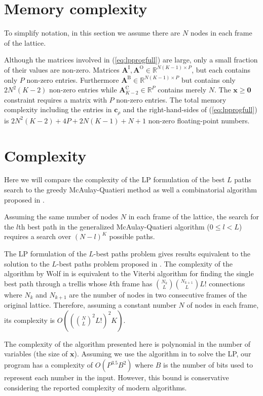 \documentclass{article}
\newcommand{\cLP}{\boldsymbol{c}_{\rho}}
\newcommand{\BS}[1]{\boldsymbol{#1}}
\begin{document}
\begin{sloppy}
\section{Memory complexity}

To simplify notation, in this section we assume there are $N$ nodes in each
frame of the lattice.

Although the matrices involved in (\ref{eq:lpprogfull}) are large, only a small
fraction of their values are non-zero. Matrices $\BS{A}^{\text{I}},
\BS{A}^{\text{O}} \in \mathbb{R}^{N(K-1) \times P}$, but each contains only $P$
non-zero entries.  Furthermore $\BS{A}^{\text{B}} \in \mathbb{R}^{N(K-1) \times
P}$ but contains only $2N^{2}(K-2)$ non-zero entries while
$\BS{A}^{\text{C}}_{K-2} \in \mathbb{R}^{P}$ contains merely $N$. The $\BS{x}
\geq \BS{0}$ constraint requires a matrix with $P$ non-zero entries. The total
memory complexity including the entries in $\cLP$ and the right-hand-sides of
(\ref{eq:lpprogfull}) is $2N^{2}(K-2) + 4P + 2N(K-1) + N + 1$ non-zero
floating-point numbers.

\section{Complexity}

Here we will compare the complexity of the LP formulation of the best $L$ paths
search to the greedy McAulay-Quatieri method as well a combinatorial algorithm
proposed in \cite{wolf1989finding}.

Assuming the same number of nodes $N$ in each frame of the lattice, the 
search for the $l$th best path in the generalized McAulay-Quatieri
algorithm ($0 \leq l < L$) requires a search over $(N-l)^{K}$ possible paths.

The LP formulation of the $L$-best paths problem gives results equivalent to the
solution to the $L$-best paths problem proposed in \cite{wolf1989finding}. The
complexity of the algorithm by Wolf in \cite{wolf1989finding} is equivalent to
the Viterbi algorithm for finding the single best path through a trellis whose
$k$th frame has $\binom{N_{k}}{L}\binom{N_{k+1}}{L}L!$ connections where $N_{k}$
and $N_{k+1}$ are the number of nodes in two consecutive frames of the original
lattice. Therefore, assuming a constant number $N$ of nodes in each frame, its
complexity is $O((\binom{N}{L}^{2}L!)^{2}K)$.

The complexity of the algorithm presented here is polynomial in the number of
variables (the size of $\BS{x}$).  Assuming we use the algorithm in
\cite{karmarkar1984new} to solve the LP, our program has a complexity of
$O(P^{3.5}B^{2})$ where $B$ is the number of bits used to represent each number
in the input.  However, this bound is conservative considering the reported
complexity of modern algorithms.


\end{sloppy}
\end{document}
